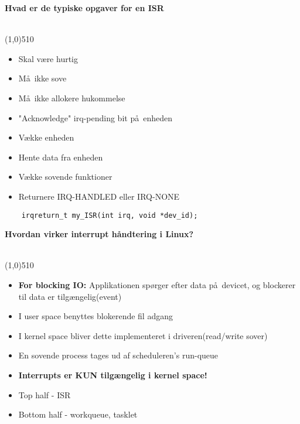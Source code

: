 \documentclass{paper}
\begin{document}
\begin{large}\textbf{Hvad er de typiske opgaver for en ISR}\end{large}\\
\line(1,0){510}
\begin{itemize}
	\item Skal v\ae re hurtig
	\item M\aa\ ikke sove
	\item M\aa\ ikke allokere hukommelse
	\item "Acknowledge" irq-pending bit p\aa\ enheden
	\item V\ae kke enheden
	\item Hente data fra enheden
	\item V\ae kke sovende funktioner
	\item Returnere IRQ-HANDLED eller IRQ-NONE
\end{itemize}
\begin{lstlisting}
	irqreturn_t my_ISR(int irq, void *dev_id);
\end{lstlisting}

\begin{large}\textbf{Hvordan virker interrupt h\aa ndtering i Linux?}\end{large}\\
\line(1,0){510}
\begin{itemize}
	\item \textbf{For blocking IO:} Applikationen sp\o rger efter data p\aa\ devicet, og blockerer til data er tilg\ae ngelig(event)
	\item I user space benyttes blokerende fil adgang
	\item I kernel space bliver dette implementeret i driveren(read/write sover)
	\item En sovende process tages ud af scheduleren's run-queue
	\item \textbf{Interrupts er KUN tilg\ae ngelig i kernel space!}
\end{itemize}

\begin{itemize}
	\item Top half - ISR
	\item Bottom half - workqueue, tasklet
\end{itemize}
	
\end{document}
